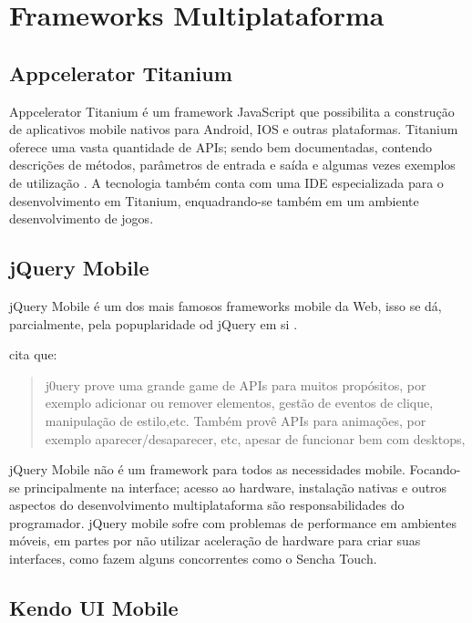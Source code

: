 \section{Frameworks Multiplataforma}

\subsection{Appcelerator Titanium}

Appcelerator Titanium é um framework JavaScript que possibilita a
construção de aplicativos mobile nativos para Android, IOS e outras
plataformas. Titanium oferece uma vasta quantidade de APIs; sendo
bem documentadas, contendo descrições de métodos, parâmetros de
entrada e saída e algumas vezes exemplos de utilização \autocite[p.
2]{crossPlatformAppsAnimations}. A tecnologia também conta com uma IDE
especializada para o desenvolvimento em Titanium, enquadrando-se também
em um ambiente desenvolvimento de jogos.

\subsection{jQuery Mobile}

jQuery Mobile é um dos mais famosos frameworks mobile da Web, isso se
dá, parcialmente, pela popuplaridade od jQuery em si \autocite[p.
14]{viabilityBusinessApplications}.

\autocite[p. 2]{crossPlatformAppsAnimations} cita que:
\begin{quote}
j0uery prove uma grande game de APIs para muitos propósitos, por
exemplo adicionar ou remover elementos, gestão de eventos de clique,
manipulação de estilo,etc. Também provê APIs para animações, por
exemplo aparecer/desaparecer, etc, apesar de funcionar bem com desktops,
\end{quote}

jQuery Mobile não é um framework para todos as necessidades mobile.
Focando-se principalmente na interface; acesso ao hardware, instalação
nativas e outros aspectos do desenvolvimento multiplataforma
são responsabilidades do programador. jQuery mobile sofre com
problemas de performance em ambientes móveis, em partes por não
utilizar aceleração de hardware para criar suas interfaces,
como fazem alguns concorrentes como o Sencha Touch\autocite[p.
14]{viabilityBusinessApplications}.

\subsection{Kendo UI Mobile}

